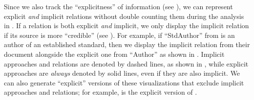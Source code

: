 
    
    \ExampleSynGraph{}

    \label{visExplicit}
    Since we also track the ``explicitness'' of information
    (see ), we can represent explicit \emph{and} implicit
    relations without double counting them during the analysis in
    . If a relation is both explicit \emph{and} implicit,
    we only display the implicit relation if its source is more ``credible''
    (see ). For example, if ``StdAuthor'' from
     is an author of an established standard, then
    we display the implicit relation from their document alongside the explicit
    one from ``Author'' as shown in .
    Implicit approaches and relations are denoted by dashed lines, as shown in
    , while explicit approaches are
    \emph{always} denoted by solid lines, even if they are also implicit. We
    can also generate ``explicit'' versions of these visualizations that exclude
    implicit approaches and relations; for example, 
    is the explicit version of %
    .

